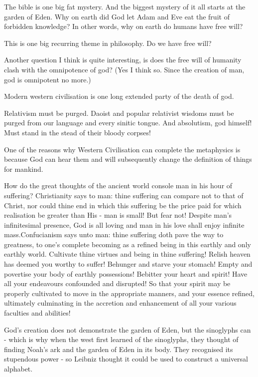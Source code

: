 The bible is one big fat mystery. And the biggest mystery of it all starts at the garden of Eden. Why on earth did God let Adam and Eve eat the fruit of forbidden knowledge? In other words, why on earth do humans have free will? 

This is one big recurring theme in philosophy. Do we have free will?

Another question I think is quite interesting, is does the free will of humanity clash with the omnipotence of god? (Yes I think so. Since the creation of man, god is omnipotent no more.) 


Modern western civilisation is one long extended party of the death of god. 



Relativism must be purged. Daoist and popular relativist wisdoms must be purged from our language and every sinitic tongue. And absolutism, god himself! Must stand in the stead of their bloody corpses!



One of the reasons why Western Civilisation can complete the metaphysics is because God can hear them and will subsequently change the definition of things for mankind. 



How do the great thoughts of the ancient world console man in his hour of suffering? Christianity says to man: thine suffering can compare not to that of Christ, nor could thine end in which this suffering be the price paid for which realisation be greater than His - man is small! But fear not! Despite man’s infinitesimal presence, God is all loving and man in his love shall enjoy infinite mass.Confucianism says unto man: thine suffering doth pave the way to greatness, to one’s complete becoming as a refined being in this earthly and only earthly world. Cultivate thine virtues and being in thine suffering! Relish heaven has deemed you worthy to suffer! Behunger and starve your stomach! Empty and povertise your body of earthly possessions! Bebitter your heart and spirit! Have all your endeavours confounded and disrupted! So that your spirit may be properly cultivated to move in the appropriate manners, and your essence refined, ultimately culminating in the accretion and enhancement of all your various faculties and abilities!


God’s creation does not demonstrate the garden of Eden, but the sinoglyphs can - which is why when the west first learned of the sinoglyphs, they thought of finding Noah’s ark and the garden of Eden in its body. They recognised its stupendous power - so Leibniz thought it could be used to construct a universal alphabet. 



